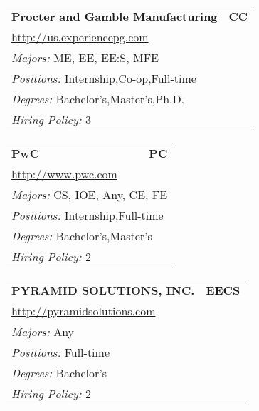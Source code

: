 \documentclass[twoside]{article}
\begin{document}
\begin{center}
\begin{multicols}{3}
\begin{FlushLeft}
\begin{minipage}{.9\columnwidth}
\end{minipage}
 
\begin{minipage}{.9\columnwidth}\begin{tabularx}{.95\columnwidth}{Xr}
                 {\Large\bf Procter and Gamble Manufacturing} & {\Large\bf CC}\\
    \multicolumn{2}{p{.95\columnwidth}}{\url{http://us.experiencepg.com}}\\
    \multicolumn{2}{p{.95\columnwidth}}{\emph{Majors:} ME, EE, EE:S, MFE}\\
    \multicolumn{2}{p{.95\columnwidth}}{\emph{Positions:} Internship,Co-op,Full-time}\\
    \multicolumn{2}{p{.95\columnwidth}}{\emph{Degrees:} Bachelor's,Master's,Ph.D.}\\
    \multicolumn{2}{p{.95\columnwidth}}{\emph{Hiring Policy:} 3}\\
    \end{tabularx}
    
\end{minipage}
 
\begin{minipage}{.9\columnwidth}\begin{tabularx}{.95\columnwidth}{Xr}
                 {\Large\bf PwC} & {\Large\bf PC}\\
    \multicolumn{2}{p{.95\columnwidth}}{\url{http://www.pwc.com}}\\
    \multicolumn{2}{p{.95\columnwidth}}{\emph{Majors:} CS, IOE, Any, CE, FE}\\
    \multicolumn{2}{p{.95\columnwidth}}{\emph{Positions:} Internship,Full-time}\\
    \multicolumn{2}{p{.95\columnwidth}}{\emph{Degrees:} Bachelor's,Master's}\\
    \multicolumn{2}{p{.95\columnwidth}}{\emph{Hiring Policy:} 2}\\
    \end{tabularx}
    
\end{minipage}
 
\begin{minipage}{.9\columnwidth}\begin{tabularx}{.95\columnwidth}{Xr}
                 {\Large\bf PYRAMID SOLUTIONS, INC.} & {\Large\bf EECS}\\
    \multicolumn{2}{p{.95\columnwidth}}{\url{http://pyramidsolutions.com}}\\
    \multicolumn{2}{p{.95\columnwidth}}{\emph{Majors:} Any}\\
    \multicolumn{2}{p{.95\columnwidth}}{\emph{Positions:} Full-time}\\
    \multicolumn{2}{p{.95\columnwidth}}{\emph{Degrees:} Bachelor's}\\
    \multicolumn{2}{p{.95\columnwidth}}{\emph{Hiring Policy:} 2}\\
    \end{tabularx}
    

\end{minipage}
\end{FlushLeft}
\end{multicols}
\end{center}
\end{document}
